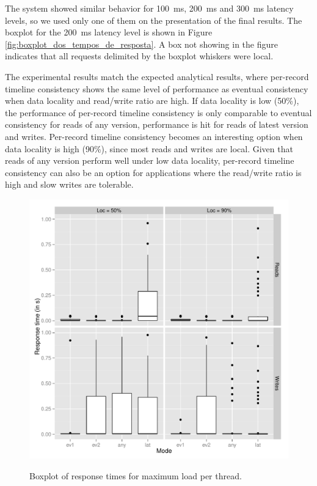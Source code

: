 \documentclass[man,floatsintext,12pt]{apa6}
\begin{document}
The system showed similar behavior for 100~ms, 200~ms and 300~ms latency
levels, so we used only one of them on the presentation of the final results.
The boxplot for the 200~ms latency level is shown in Figure
\ref{fig:boxplot_dos_tempos_de_resposta}. A box not showing in the figure
indicates that all requests delimited by the boxplot whiskers were local.

The experimental results match the expected analytical results, where
per-record timeline consistency shows the same level of performance as eventual
consistency when data locality and read/write ratio are high.  If data locality
is low (50\%), the performance of per-record timeline consistency is only
comparable to eventual consistency for reads of any version, performance is hit
for reads of latest version and writes.  Per-record timeline consistency
becomes an interesting option when data locality is high (90\%), since most
reads and writes are local. Given that reads of any version perform well under
low data locality, per-record timeline consistency can also be an option for
applications where the read/write ratio is high and slow writes are tolerable.

\begin{figure}[h!]
\caption{Boxplot of response times for maximum load per thread.}
\includegraphics[width=1.0\textwidth]{boxplot200_max.png}
\label{fig:boxplot_dos_tempos_de_resposta_para_carga_maxima}
\end{figure}
\end{document}
